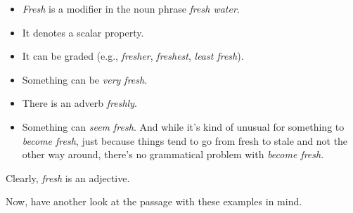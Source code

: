 \begin{itemize}[noitemsep]
    \item \textit{Fresh} is a modifier in the noun phrase \textit{fresh water}.
    \item It denotes a scalar property.
    \item It can be graded (e.g., \textit{fresher}, \textit{freshest}, \textit{least fresh}).
    \item Something can be \textit{very fresh}.
    \item There is an adverb \textit{freshly}.
    \item Something can \textit{seem fresh}. And while it's kind of unusual for something to \textit{become fresh}, just because things tend to go from fresh to stale and not the other way around, there's no grammatical problem with \textit{become fresh}.
\end{itemize}
Clearly, \textit{fresh} is an adjective.

Now, have another look at the passage with these examples in mind.

